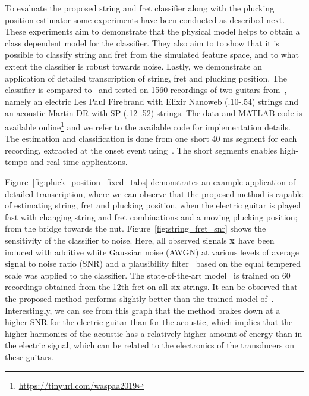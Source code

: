 To evaluate the proposed string and fret classifier along with the plucking position estimator some experiments have been conducted as described next. These experiments aim to demonstrate that the physical model helps to obtain a class dependent model for the classifier. They also aim to to show that it is possible to classify string and fret from the simulated feature space, and to what extent the classifier is robust towards noise. Lastly, we demonstrate an application of detailed transcription of string, fret and plucking position. The classifier is compared to~\cite{hjerrild::icassp19} and tested on 1560 recordings of two guitars from~\cite{hjerrild::icassp19}, namely an electric Les Paul Firebrand with Elixir Nanoweb (.10-.54) strings and an acoustic Martin DR with SP (.12-.52) strings. The data and MATLAB code is available online\footnote{\url{https://tinyurl.com/waspaa2019}} and we refer to the available code for implementation details. The estimation and classification is done from one short 40 ms segment for each recording, extracted at the onset event using~\cite{olivier:mirtoolbox_dafx}. The short segments enables high-tempo and real-time applications. 

Figure~\ref{fig:pluck_position_fixed_tabs} demonstrates an example application of detailed transcription, where we can observe that the proposed method is capable of estimating string, fret and plucking position, when the electric guitar is played fast with changing string and fret combinations and a moving plucking position; from the bridge towards the nut. Figure~\ref{fig:string_fret_snr} shows the sensitivity of the classifier to noise. Here, all observed signals $\mathbf x$ have been induced with additive white Gaussian noise (AWGN) at various levels of average signal to noise ratio (SNR) and a plausibility filter~\cite{abesser:automatic_string_detection_ml,hjerrild::icassp19} based on the equal tempered scale was applied to the classifier. The state-of-the-art model~\cite{hjerrild::icassp19} is trained on 60 recordings obtained from the 12th fret on all six strings. It can be observed that the proposed method performs slightly better than the trained model of~\cite{hjerrild::icassp19}. Interestingly, we can see from this graph that the method brakes down at a higher SNR for the electric guitar than for the acoustic, which implies that the higher harmonics of the acoustic has a relatively higher amount of energy than in the electric signal, which can be related to the electronics of the transducers on these guitars. 

